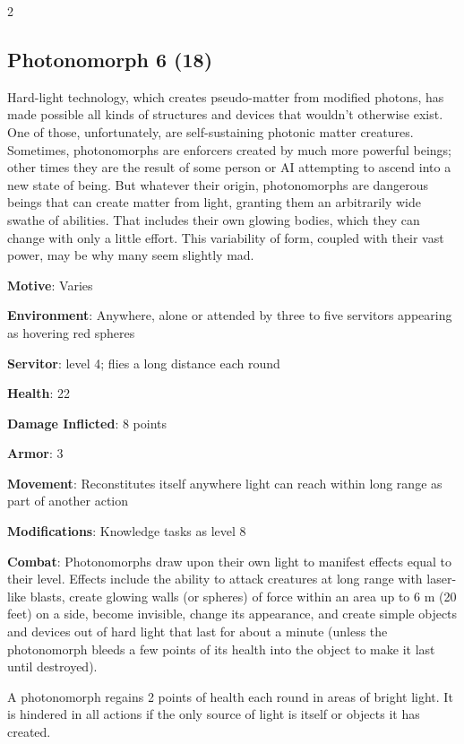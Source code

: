 \begin{multicols}{2}
\subsection{Photonomorph 6 (18)}

Hard-light technology, which creates pseudo-matter from modified photons, has made possible all kinds of structures and devices that wouldn’t otherwise exist. One of those, unfortunately, are self-sustaining photonic matter creatures. Sometimes, photonomorphs are enforcers created by much more powerful beings; other times they are the result of some person or AI attempting to ascend into a new state of being. But whatever their origin, photonomorphs are dangerous beings that can create matter from light, granting them an arbitrarily wide swathe of abilities. That includes their own glowing bodies, which they can change with only a little effort. This variability of form, coupled with their vast power, may be why many seem slightly mad. 

\textbf{Motive}: Varies 

\textbf{Environment}: Anywhere, alone or attended by three to five servitors appearing as hovering red spheres 

\textbf{Servitor}: level 4; flies a long distance each round

\textbf{Health}: 22 

\textbf{Damage Inflicted}: 8 points 

\textbf{Armor}: 3 

\textbf{Movement}: Reconstitutes itself anywhere light can reach within long range as part of another action 

\textbf{Modifications}: Knowledge tasks as level 8 

\textbf{Combat}: Photonomorphs draw upon their own light to manifest effects equal to their level. Effects include the ability to attack creatures at long range with laser-like blasts, create glowing walls (or spheres) of force within an area up to 6 m (20 feet) on a side, become invisible, change its appearance, and create simple objects and devices out of hard light that last for about a minute (unless the photonomorph bleeds a few points of its health into the object to make it last until destroyed). 

A photonomorph regains 2 points of health each round in areas of bright light. It is hindered in all actions if the only source of light is itself or objects it has created. 


\end{multicols}
